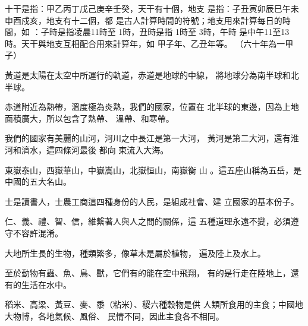 \documentclass[avery5371,grid]{flashcards}
\begin{document}
{十干是指：甲乙丙丁戊己庚辛壬癸，天干有十個，地支
是指：子丑寅卯辰巳午未申酉戍亥，地支有十二個，都
是古人計算時間的符號；地支用來計算每日的時間，如
：子時是指凌晨11時至 1時，丑時是指 1時至 3時，午時
是中午11至13時。天干與地支互相配合用來計算年，如
甲子年、乙丑年等。} %
{（六十年為一甲子）} %


{黃道是太陽在太空中所運行的軌道，赤道是地球的中線，
將地球分為南半球和北半球。} %
{} %


{赤道附近為熱帶，溫度極為炎熱，我們的國家，位置在
北半球的東邊，因為上地面積廣大，所以包含了熱帶、
溫帶、和寒帶。} %
{} %


{我們的國家有美麗的山河，河川之中長江是第一大河，
黃河是第二大河，還有淮河和濟水，這四條河最後 都向
東流入大海。} %
{} %


{東嶽泰山，西嶽華山，中嶽嵩山，北嶽恒山，南嶽衡
山 。這五座山稱為五岳，是中國的五大名山。} %
{} %


{士是讀書人，士農工商這四種身份的人民，是組成社會、建
立國家的基本份子。} %
{} %





{仁、義、禮、智、信，維繫著人與人之間的關係，這
五種道理永遠不變，必須遵守不容許混淆。} %
{} %

{大地所生長的生物，種類繁多，像草木是屬於植物，
遍及陸上及水上。} %
{} %

{至於動物有蟲、魚、鳥、獸，它們有的能在空中飛翔，
有的是行走在陸地上，還有的生活在水中。} %
{} %

{稻米、高梁、黃豆、麥、黍（粘米）、稷六種穀物是供
人類所食用的主食；中國地大物博，各地氣候、風俗、
民情不同，因此主食各不相同。} %
{} %
\end{document}
